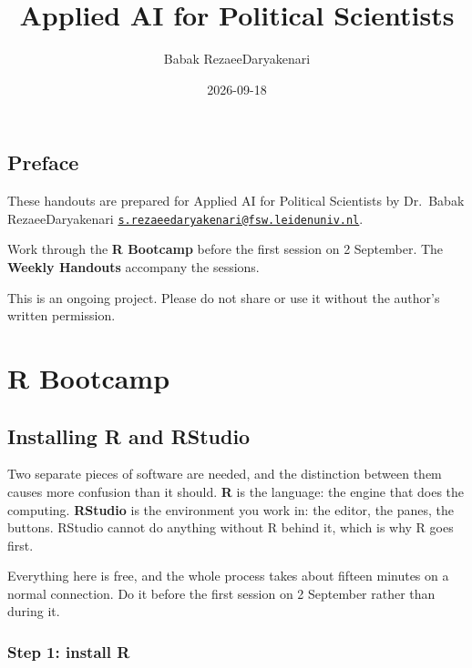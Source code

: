 \documentclass[
  a4paper,
]{scrbook}
\title{Applied AI for Political Scientists}
\author{Babak RezaeeDaryakenari}
\date{2026-09-18}
\renewcommand*\contentsname{Table of contents}
\newcommand\contentsname{Table of contents}
\begin{document}
\frontmatter
\maketitle

\renewcommand*\contentsname{Table of contents}
{
\setcounter{tocdepth}{2}
\tableofcontents
}

\mainmatter
{}

\chapter*{Preface}\label{preface}


These handouts are prepared for Applied AI for Political Scientists by
Dr.~Babak RezaeeDaryakenari
\href{mailto:s.rezaeedaryakenari@fsw.leidenuniv.nl}{\nolinkurl{s.rezaeedaryakenari@fsw.leidenuniv.nl}}.

Work through the \textbf{R Bootcamp} before the first session on 2
September. The \textbf{Weekly Handouts} accompany the sessions.

This is an ongoing project. Please do not share or use it without the
author's written permission.

\part{R Bootcamp}

\chapter*{Installing R and RStudio}\label{installing-r-and-rstudio}


Two separate pieces of software are needed, and the distinction between
them causes more confusion than it should. \textbf{R} is the language:
the engine that does the computing. \textbf{RStudio} is the environment
you work in: the editor, the panes, the buttons. RStudio cannot do
anything without R behind it, which is why R goes first.

Everything here is free, and the whole process takes about fifteen
minutes on a normal connection. Do it before the first session on 2
September rather than during it.

\section*{Step 1: install R}\label{step-1-install-r}
\end{document}
